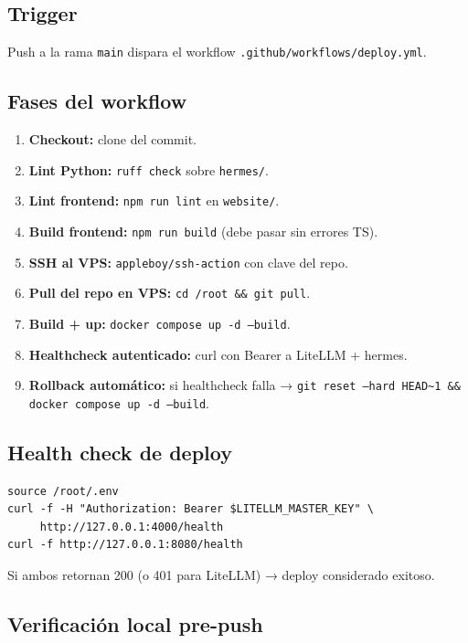\documentclass[11pt,a4paper]{article}
\begin{document}
\subsection{Trigger}

Push a la rama \texttt{main} dispara el workflow \texttt{.github/workflows/deploy.yml}.

\subsection{Fases del workflow}

\begin{enumerate}[leftmargin=*,itemsep=2pt]
\item \textbf{Checkout:} clone del commit.
\item \textbf{Lint Python:} \texttt{ruff check} sobre \texttt{hermes/}.
\item \textbf{Lint frontend:} \texttt{npm run lint} en \texttt{website/}.
\item \textbf{Build frontend:} \texttt{npm run build} (debe pasar sin errores TS).
\item \textbf{SSH al VPS:} \texttt{appleboy/ssh-action} con clave del repo.
\item \textbf{Pull del repo en VPS:} \texttt{cd /root \&\& git pull}.
\item \textbf{Build + up:} \texttt{docker compose up -d --build}.
\item \textbf{Healthcheck autenticado:} curl con Bearer a LiteLLM + hermes.
\item \textbf{Rollback automático:} si healthcheck falla → \texttt{git reset --hard HEAD\textasciitilde 1 \&\& docker compose up -d --build}.
\end{enumerate}

\subsection{Health check de deploy}

\begin{lstlisting}[language=bashx]
source /root/.env
curl -f -H "Authorization: Bearer $LITELLM_MASTER_KEY" \
     http://127.0.0.1:4000/health
curl -f http://127.0.0.1:8080/health
\end{lstlisting}

Si ambos retornan 200 (o 401 para LiteLLM) → deploy considerado exitoso.

\subsection{Verificación local pre-push}
\end{document}

